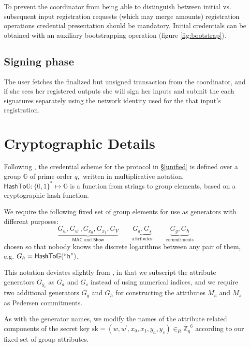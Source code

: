 \documentclass{article}
\begin{document}
To prevent the coordinator from being able to distinguish between initial vs. subsequent input registration requests (which may merge amounts) registration operations credential presentation should be mandatory. Initial credentials can be obtained with an auxiliary bootstrapping operation (figure \ref{fig:bootstrap}).

\subsection{Signing phase}

The user fetches the finalized but unsigned transaction from the coordinator, and if she sees her registered outputs she will sign her inputs and submit the each signatures separately using the network identity used for the that input's registration.

\section{Cryptographic Details}\label{details}

Following \cite{chase2019signal}, the credential scheme for the protocol in \S\ref{unified} is defined over a group \(\mathbb{G}\) of prime order \(q,\) written in multiplicative notation.
$\mathsf{HashTo\mathbb{G}} : \{0,1\}^{*} \mapsto \mathbb{G}$ is a function from strings to group elements, based on a cryptographic hash function\cite{fouque2012indifferentiable}.

We require the following fixed set of group elements for use as generators with different purposes:
\[
\underbrace{G_{w}, G_{w^{\prime}}, G_{x_{0}}, G_{x_{1}}, G_{V}}_{\mathsf{MAC} \text{~and~} \mathsf{Show}}
\qquad
\underbrace{G_{a}, G_{s}}_{\text{attributes}}
\qquad
\underbrace{G_g, G_h}_{\text{commitments}}
\]
chosen so that nobody knows the discrete logarithms between any pair of them, e.g. $G_h = \mathsf{HashTo\mathbb{G}}(``\texttt{h}")$.

This notation deviates slightly from \cite{chase2019signal}, in that we subscript the attribute generators $G_{y_i}$ as $G_a$ and $G_s$ instead of using numerical indices, and we require two additional generators $G_g$ and $G_h$ for constructing the attributes $M_a$ and $M_s$ as Pedersen commitments.

As with the generator names, we modify the names of the attribute related components of the secret key
$\mathrm{sk} = (w, w^{\prime}, x_{0}, x_{1}, y_{a}, y_{s}) \in_R {\mathbb{Z}_q}^6$
according to our fixed set of group attributes.
\end{document}
